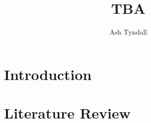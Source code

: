 \documentclass{cshonours}
\title{\ther TBA}
\author{Ash Tyndall}
\begin{document}
\maketitle

\tableofcontents
\listoftables
\listoffigures

\chapter{Introduction}

\cite{safeware}

\chapter{Literature Review}

\appendix


\end{document}
